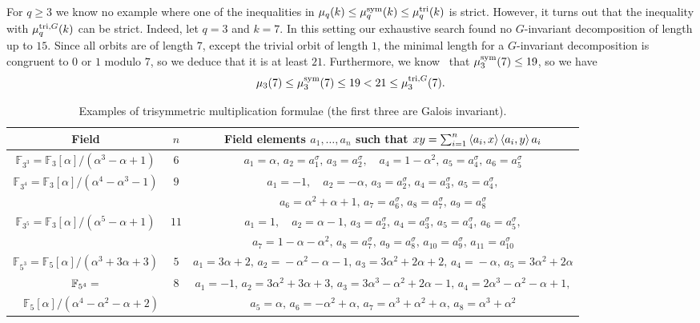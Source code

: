 \documentclass[11pt]{article}
\begin{document}
For $q\geq3$ we know no example where one of the inequalities in $\mu_q(k)\leq\mu^{\textrm{sym}}_q(k)\leq\mu^{\textrm{tri}}_q(k)$
is strict. However, it turns out that the inequality with $\mu^{\textrm{tri},G}_q(k)$ can be strict.
Indeed, let $q=3$ and $k=7$. In this setting our exhaustive search
found no $G$-invariant decomposition of length up to $15$. Since all orbits are of length $7$, 
except the trivial orbit of length $1$, the minimal length for a $G$-invariant decomposition is
congruent to $0$ or $1$ modulo $7$, so we deduce that it is
at least $21$. Furthermore, we know~\cite[table~2]{BCPRRR19} that $\mu^{\textrm{sym}}_3(7)\leq19$, so we have
\[ \mu_3(7)\leq\mu^{\textrm{sym}}_3(7)\leq 19<21\leq \mu^{\textrm{tri},G}_3(7). \]

\begin{table}
  \centering
  \footnotesize
  \begin{tabular}{|c|c|c|}
    \hline
    Field & $n$ & Field elements $a_1,\dots,a_n$ such that $xy = \sum_{i=1}^n\left\langle a_i,x\right\rangle\left\langle a_i,y\right\rangle a_i$ \\
    \hline
    \hline
    $\mathbb{F}_{3^3}=\mathbb{F}_3[\alpha]/(\alpha^3\!-\!\alpha\!+\!1)$ & $6$ &
    $a_1 = \alpha,\, a_2 = a_1^\sigma,\, a_3 = a_2^{\sigma},\quad
    a_4 = 1\!-\!\alpha^2,\, a_5=a_4^\sigma,\, a_6=a_5^{\sigma}$ \\ 
    \hline
    \multirow{2}{*}{$\mathbb{F}_{3^4}=\mathbb{F}_3[\alpha]/(\alpha^4\!-\!\alpha^3\!-\!1)$} & \multirow{2}{*}{$9$} &
    $a_1 = -1,\quad a_2 = -\alpha,\, a_3 = a_2^\sigma,\, a_4 = a_3^\sigma,\, a_5 = a_4^\sigma,$\\
    & & $a_6 = \alpha^2\!+\!\alpha\!+\!1,\, a_7 = a_6^\sigma,\, a_8 = a_7^\sigma,\,a_9=a_8^\sigma$\\
    \hline
    \multirow{2}{*}{$\mathbb{F}_{3^5}=\mathbb{F}_3[\alpha]/(\alpha^5\!-\!\alpha\!+\!1)$} & \multirow{2}{*}{$11$} &
    $a_1 = 1,\quad a_2 = \alpha\!-\!1,\, a_3 = a_2^\sigma,\, a_4=a_3^\sigma,\, a_5=a_4^\sigma,\, a_6=a_5^\sigma, $\\
    & & $a_7 = 1\!-\!\alpha\!-\!\alpha^2,\, a_8=a_7^\sigma,\,a_9 = a_8^\sigma,\, a_{10} = a_9^\sigma,\, a_{11} = a_{10}^\sigma $\\
    \hline
    $\mathbb{F}_{5^3}=\mathbb{F}_5[\alpha]/(\alpha^3\!+\!3\alpha\!+\!3)$ & $5$ & $a_1\! =\! 3\alpha\!+\!2,\,
  a_2\!=\!-\alpha^2\!-\!\alpha\!-\!1,\, a_3\! =\! 3\alpha^2\!+\!2\alpha\!+\!2,\, a_4\!=\!-\alpha,\, a_5\! =\!
  3\alpha^2\!+\! 2\alpha$\\
   \hline
   $\mathbb{F}_{5^4}=\hfill$ &
   \multirow{2}{*}{$8$} & $a_1=-1,\, a_2 = 3\alpha^2\!+\!3\alpha\!+\!3,\, a_3 = 3\alpha^3\!-\!\alpha^2\!+\!2\alpha\!-\!1,\, a_4 = 2\alpha^3\!-\!\alpha^2\!-\!\alpha\!+\!1,$\\ 
   $\quad\mathbb{F}_5[\alpha]/(\alpha^4\!-\!\alpha^2\!-\!\alpha\!+\!2)$&  & $a_5 = \alpha,\, a_6=-\alpha^2\!+\!\alpha,\, a_7 = \alpha^3\!+\!\alpha^2\!+\!\alpha,\, a_8 = \alpha^3\!+\!\alpha^2$\\
   \hline
  \end{tabular}
\caption{Examples of trisymmetric multiplication formulae (the first three are Galois invariant).}
  \label{tab:formulae}
\end{table}
\end{document}
